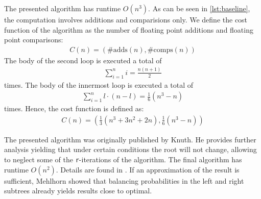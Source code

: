  The presented algorithm has runtime $O(n^3)$. As can
be seen in \autoref{lst:baseline}, the computation involves additions and
comparisions only. We define the cost function of the algorithm as the
number of floating point additions and floating point comparisons:
\begin{align*}
C(n) = (\#\text{adds}(n), \#\text{comps}(n))
\end{align*}
The body of the second loop is executed a total of
\begin{align*}
\sum_{i=1}^{n} i = \frac{n(n+1)}{2}
\end{align*}
times. The body of the innermost loop is executed a total of
\begin{align*}
\sum_{i=1}^{n} l\cdot(n-l) = \frac{1}{6}(n^3-n)
\end{align*}
times.  Hence, the cost function is defined as:
\begin{align*}
C(n) = \left(\frac{1}{3}(n^3+3n^2+2n), \frac{1}{6}(n^3 - n)\right)
\end{align*}

 The presented algorithm was originally
published by Knuth. He provides further analysis yielding that under
certain conditions the root will not change, allowing to neglect some of
the \texttt{r}-iterations of the algorithm. The final algorithm has runtime
$O(n^2)$. Details are found in \cite{Knuth70}. If an approximation of the
result is sufficient, Mehlhorn \cite{Mehlhorn75} showed that balancing
probabilities in the left and right subtrees already yields results close
to optimal.
